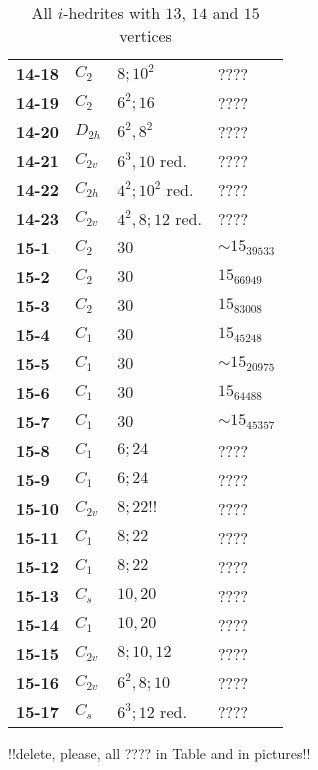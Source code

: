 \documentclass[12pt]{article}
\begin{document}
\begin{table}
\begin{center}
{\begin{minipage}[t]{7cm}
\begin{tabular}{||l|l|l|l||}
{\bf 14-18}     &$C_2$  &$8; 10^2$      &????\\
{\bf 14-19}     &$C_2$  &$6^2; 16$      &????\\
{\bf 14-20}     &$D_{2h}$       &$6^2, 8^2$     &????\\
{\bf 14-21}     &$C_{2v}$       &$6^3, 10$ red. &????\\
{\bf 14-22}     &$C_{2h}$       &$4^2; 10^2$ red.       &????\\
{\bf 14-23}     &$C_{2v}$       &$4^2, 8; 12$ red.      &????\\\hline
{\bf 15-1}      &$C_2$  &$30$   &$\sim 15_{39533}$\\
{\bf 15-2}      &$C_2$  &$30$   &$15_{66949}$\\
{\bf 15-3}      &$C_2$  &$30$   &$15_{83008}$\\
{\bf 15-4}      &$C_1$  &$30$   &$15_{45248}$\\
{\bf 15-5}      &$C_1$  &$30$   &$\sim 15_{20975}$\\
{\bf 15-6}      &$C_1$  &$30$   &$15_{64488}$\\
{\bf 15-7}      &$C_1$  &$30$   &$\sim 15_{45357}$\\
{\bf 15-8}      &$C_1$  &$6; 24$        &????\\
{\bf 15-9}      &$C_1$  &$6; 24$        &????\\
{\bf 15-10}     &$C_{2v}$       &$8; 22!!$     &????\\
{\bf 15-11}     &$C_1$  &$8; 22$        &????\\
{\bf 15-12}     &$C_1$  &$8; 22$        &????\\
{\bf 15-13}     &$C_s$  &$10, 20$       &????\\
{\bf 15-14}     &$C_1$  &$10,20$        &????\\
{\bf 15-15}     &$C_{2v}$       &$8;10,12$      &????\\
{\bf 15-16}     &$C_{2v}$       &$6^2,8;10$     &????\\
{\bf 15-17}     &$C_s$  &$6^3; 12$ red. &????\\\hline
\hline
\end{tabular}
\end{minipage}
}
\end{center}
\caption{All $i$-hedrites with $13$, $14$ and $15$ vertices}
\label{tab:i-hedrite13_14}
\end{table}

!!delete, please, all ???? in Table and in pictures!!
\end{document}
